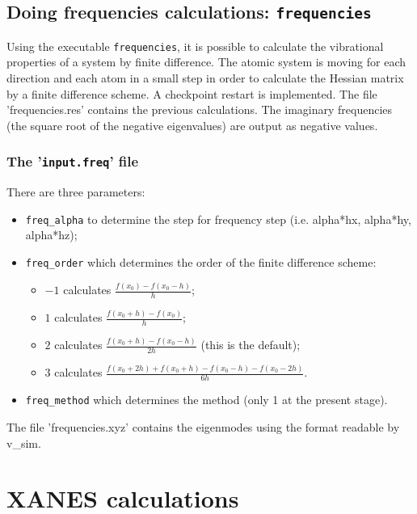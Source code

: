 \documentclass[a4paper,11pt]{report}
\begin{document}
\section{Doing frequencies calculations: \texttt{frequencies}}
Using the executable \texttt{frequencies}, it is possible to calculate the vibrational properties of
a system by finite difference. The atomic system is moving for each direction and each atom in a
small step in order to calculate the Hessian matrix by a finite difference scheme.
A checkpoint restart is implemented. The file 'frequencies.res' contains the previous calculations.
The imaginary frequencies (the square root of the negative eigenvalues) are output as negative values.

\subsection{The '\texttt{input.freq}' file}
There are three parameters:
\begin{itemize}
\item \texttt{freq\_alpha} to determine the step for frequency step (i.e. alpha*hx, alpha*hy, alpha*hz);
\item \texttt{freq\_order} which determines the order of the finite difference scheme:
      \begin{itemize}
      \item $-1$ calculates $\frac{f(x_0)-f(x_0-h)}{h}$;
      \item $1$ calculates $\frac{f(x_0+h)-f(x_0)}{h}$;
      \item $2$ calculates $\frac{f(x_0+h)-f(x_0-h)}{2h}$ (this is the default);
      \item $3$ calculates $\frac{f(x_0+2h)+f(x_0+h)-f(x_0-h)-f(x_0-2h)}{6h}$.
      \end{itemize}
\item \texttt{freq\_method} which determines the method (only 1 at the present stage).
\end{itemize}

The file 'frequencies.xyz' contains the eigenmodes using the format readable by v\_sim.

\chapter{XANES calculations}
\end{document}
